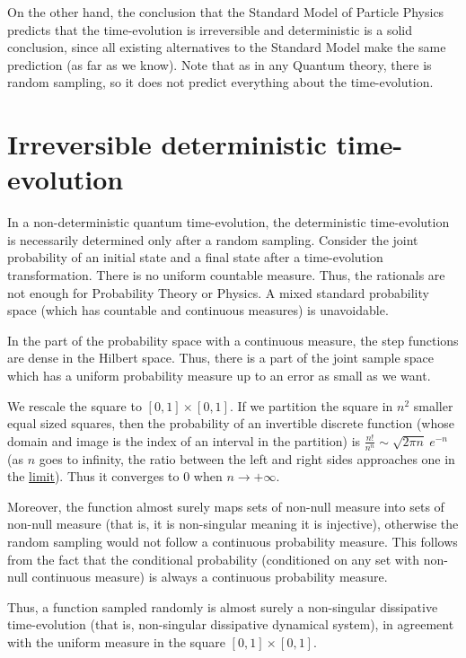 \documentclass[11pt]{book}
\begin{document}
On the other hand, the conclusion that the Standard Model of Particle
Physics predicts that the time-evolution is irreversible and
deterministic is a solid conclusion, since all existing alternatives to
the Standard Model make the same prediction (as far as we know). Note
that as in any Quantum theory, there is random sampling, so it does not
predict everything about the time-evolution.

\hypertarget{irreversible-deterministic-time-evolution}{%
\section{Irreversible deterministic
time-evolution}\label{irreversible-deterministic-time-evolution}}

In a non-deterministic quantum time-evolution, the deterministic
time-evolution is necessarily determined only after a random sampling.
Consider the joint probability of an initial state and a final state
after a time-evolution transformation. There is no uniform countable
measure. Thus, the rationals are not enough for Probability Theory or
Physics. A mixed standard probability space (which has countable and
continuous measures) is unavoidable.

In the part of the probability space with a continuous measure, the step
functions are dense in the Hilbert space. Thus, there is a part of the
joint sample space which has a uniform probability measure up to an
error as small as we want.

We rescale the square to \([0,1]\times [0,1]\). If we partition the
square in \(n^2\) smaller equal sized squares, then the probability of
an invertible discrete function (whose domain and image is the index of
an interval in the partition) is
\(\frac{n!}{n^n}\sim\sqrt{2\pi n}\ e^{-n}\) (as \(n\) goes to infinity,
the ratio between the left and right sides approaches one in the
\href{https://en.wikipedia.org/wiki/Limit_(mathematics)}{limit}). Thus
it converges to \(0\) when \(n\to +\infty\).

Moreover, the function almost surely maps sets of non-null measure into
sets of non-null measure (that is, it is non-singular meaning it is
injective), otherwise the random sampling would not follow a continuous
probability measure. This follows from the fact that the conditional
probability (conditioned on any set with non-null continuous measure) is
always a continuous probability measure.

Thus, a function sampled randomly is almost surely a non-singular
dissipative time-evolution (that is, non-singular dissipative dynamical
system), in agreement with the uniform measure in the square
\([0,1]\times [0,1]\).
\end{document}
